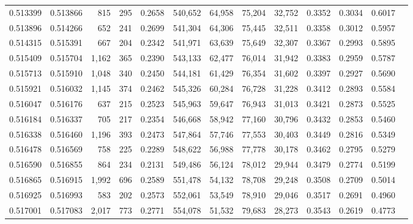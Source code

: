 \begin{tabular}{rrrrrrrrrrrrr}
0.513399 & 0.513866 &   815 &   295 &                                     0.2658 & 540,652 &  64,958 &  75,204 &  32,752 & 0.3352 & 0.3034 & 0.6017 \\
0.513896 & 0.514266 &   652 &   241 &                                     0.2699 & 541,304 &  64,306 &  75,445 &  32,511 & 0.3358 & 0.3012 & 0.5957 \\
0.514315 & 0.515391 &   667 &   204 &                                     0.2342 & 541,971 &  63,639 &  75,649 &  32,307 & 0.3367 & 0.2993 & 0.5895 \\
0.515409 & 0.515704 & 1,162 &   365 &                                     0.2390 & 543,133 &  62,477 &  76,014 &  31,942 & 0.3383 & 0.2959 & 0.5787 \\
0.515713 & 0.515910 & 1,048 &   340 &                                     0.2450 & 544,181 &  61,429 &  76,354 &  31,602 & 0.3397 & 0.2927 & 0.5690 \\
0.515921 & 0.516032 & 1,145 &   374 &                                     0.2462 & 545,326 &  60,284 &  76,728 &  31,228 & 0.3412 & 0.2893 & 0.5584 \\
0.516047 & 0.516176 &   637 &   215 &                                     0.2523 & 545,963 &  59,647 &  76,943 &  31,013 & 0.3421 & 0.2873 & 0.5525 \\
0.516184 & 0.516337 &   705 &   217 &                                     0.2354 & 546,668 &  58,942 &  77,160 &  30,796 & 0.3432 & 0.2853 & 0.5460 \\
0.516338 & 0.516460 & 1,196 &   393 &                                     0.2473 & 547,864 &  57,746 &  77,553 &  30,403 & 0.3449 & 0.2816 & 0.5349 \\
0.516478 & 0.516569 &   758 &   225 &                                     0.2289 & 548,622 &  56,988 &  77,778 &  30,178 & 0.3462 & 0.2795 & 0.5279 \\
0.516590 & 0.516855 &   864 &   234 &                                     0.2131 & 549,486 &  56,124 &  78,012 &  29,944 & 0.3479 & 0.2774 & 0.5199 \\
0.516865 & 0.516915 & 1,992 &   696 &                                     0.2589 & 551,478 &  54,132 &  78,708 &  29,248 & 0.3508 & 0.2709 & 0.5014 \\
0.516925 & 0.516993 &   583 &   202 &                                     0.2573 & 552,061 &  53,549 &  78,910 &  29,046 & 0.3517 & 0.2691 & 0.4960 \\
0.517001 & 0.517083 & 2,017 &   773 &                                     0.2771 & 554,078 &  51,532 &  79,683 &  28,273 & 0.3543 & 0.2619 & 0.4773 \\

\end{tabular}

